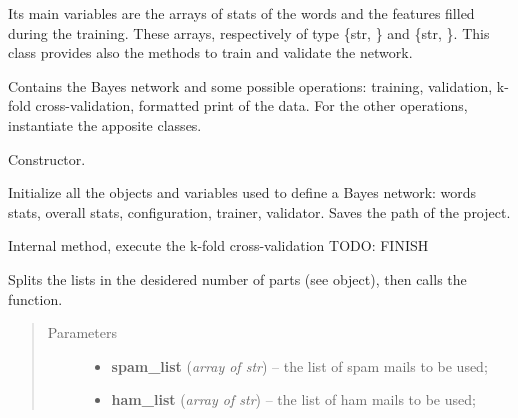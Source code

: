 \documentclass[letterpaper,10pt,english]{sphinxmanual}
\begin{document}
Its main variables are the arrays of stats of the words and the features filled during the training. These arrays, respectively of type \{str, {\hyperref[index:gen_stat.Word]{}}\} and \{str, {\hyperref[index:gen_stat.Stat]{}}\}. This class provides also the methods to train and validate the network.
\label{index:module-naive_bayes}

\begin{fulllineitems}
\label{index:naive_bayes.Bayes}
Contains the Bayes network and some possible operations: training,
validation, k-fold cross-validation, formatted print of the data.
For the other operations, instantiate the apposite classes.

\begin{fulllineitems}
\label{index:naive_bayes.Bayes.__init__}
Constructor.

Initialize all the objects and variables used to define a Bayes network:
words stats, overall stats, configuration, trainer, validator.
Saves the path of the project.

\end{fulllineitems}


\begin{fulllineitems}
\label{index:naive_bayes.Bayes._k_fold_cross_validation}
Internal method, execute the k-fold cross-validation TODO: FINISH

Splits the lists in the desidered number of parts
(see {\hyperref[index:config.Config]{}} object),
then calls the {\hyperref[index:trainer.Trainer.train]{}} function.
\begin{quote}\begin{description}
\item[{Parameters}] \leavevmode\begin{itemize}
\item {} 
\textbf{spam\_list} (\emph{array of str}) -- the list of spam mails to be used;

\item {} 
\textbf{ham\_list} (\emph{array of str}) -- the list of ham mails to be used;


\end{itemize}
\end{description}
\end{quote}
\end{fulllineitems}
\end{fulllineitems}
\end{document}
